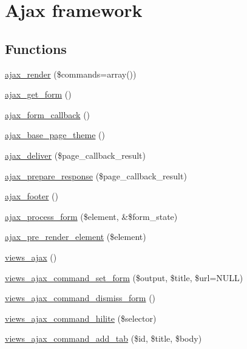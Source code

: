 \hypertarget{group__ajax}{
\section{Ajax framework}
\label{group__ajax}
}
\subsection*{Functions}
\begin{DoxyCompactItemize}
\item 
\hyperlink{group__ajax_ga241c2426bdde049c55b05b7bf5d714a2}{ajax\_\-render} (\$commands=array())
\item 
\hyperlink{group__ajax_ga9bc57ec64df41b20fd92b21fe8c1e6b0}{ajax\_\-get\_\-form} ()
\item 
\hyperlink{group__ajax_gabe2739824006df057d291f6be49759ab}{ajax\_\-form\_\-callback} ()
\item 
\hyperlink{group__ajax_ga9d02bfeb3c0e9c3aa36c7f7645a042eb}{ajax\_\-base\_\-page\_\-theme} ()
\item 
\hyperlink{group__ajax_ga44a56b3660e97b39f87535a9a2bc8d8a}{ajax\_\-deliver} (\$page\_\-callback\_\-result)
\item 
\hyperlink{group__ajax_ga1dc07e6b41b955efdf29c2e7bf0aecdd}{ajax\_\-prepare\_\-response} (\$page\_\-callback\_\-result)
\item 
\hyperlink{group__ajax_ga6994db099f28d8e2d51218813e730834}{ajax\_\-footer} ()
\item 
\hyperlink{group__ajax_ga41a006b5f6d97e6e56e542f68fbc340d}{ajax\_\-process\_\-form} (\$element, \&\$form\_\-state)
\item 
\hyperlink{group__ajax_ga028d2f2b6b3875d91ea6cc88b19f237b}{ajax\_\-pre\_\-render\_\-element} (\$element)
\item 
\hyperlink{group__ajax_ga5f1adff7f07ea45d8ab62b456ffdd6e0}{views\_\-ajax} ()
\item 
\hyperlink{group__ajax_gac5062864272f5b8134072eb22a661e6f}{views\_\-ajax\_\-command\_\-set\_\-form} (\$output, \$title, \$url=NULL)
\item 
\hyperlink{group__ajax_gac0331ece9a64afe1350f116b9c5a79f1}{views\_\-ajax\_\-command\_\-dismiss\_\-form} ()
\item 
\hyperlink{group__ajax_ga22d27c9ab6b8a95f4903463eb6aabf8d}{views\_\-ajax\_\-command\_\-hilite} (\$selector)
\item 
\hyperlink{group__ajax_ga9e55776de616656e252b0f9eb8851e82}{views\_\-ajax\_\-command\_\-add\_\-tab} (\$id, \$title, \$body)

\end{DoxyCompactItemize}
